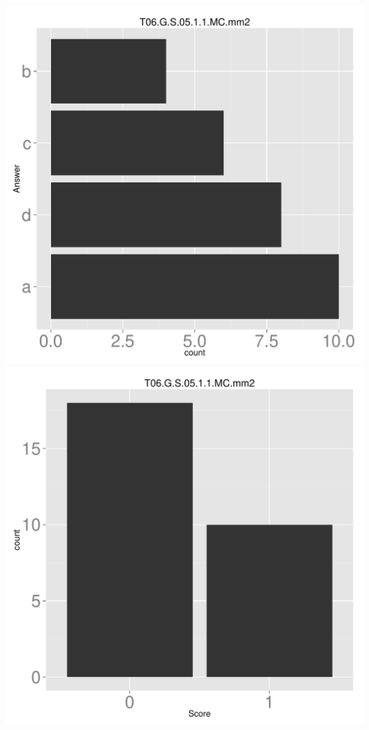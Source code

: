 \documentclass[12pt,nohyper]{tufte-handout}\usepackage[]{graphicx}\usepackage[]{color}
\begin{document}
\begin{center} \includegraphics[width=.45\linewidth]{Topic06_75_answer} \includegraphics[width=.45\linewidth]{Topic06_75_score} \end{center} 
\end{document}
